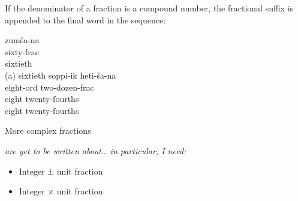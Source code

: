 \documentclass[grammar]{subfiles}
\begin{document}
  If the denominator of a fraction is a compound number, the fractional suffix is appended to the final word in the sequence:

  \begin{exe}
    \ex
    \begin{xlist}
      \ex {}
      \glll zumša-na\\
      sixty-\acs{frac}\\
      sixtieth\\
      \glt (a) sixtieth
      \ex {}
      \glll soppi-ik heti-ša-na\\
      eight-\acs{ord} two-dozen-\acs{frac}\\
      eight twenty-fourths\\
      \glt eight twenty-fourths
    \end{xlist}
  \end{exe}


  More complex fractions {\em are yet to be written about… in particular, I need:
    \begin{itemize}
      \item Integer ± unit fraction
      \item Integer × unit fraction
    \end{itemize}
  }
\end{document}
